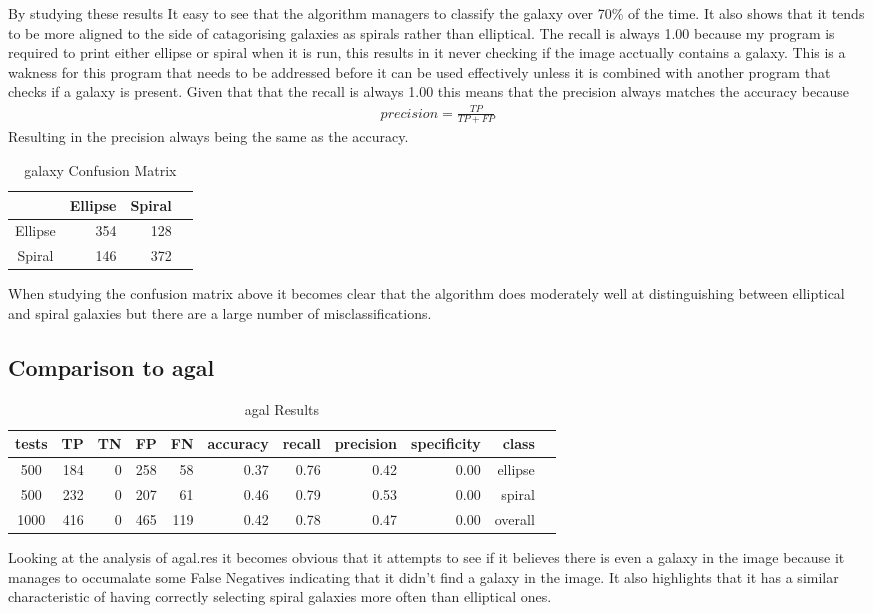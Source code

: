 \documentclass{article}
\begin{document}
By studying these results It easy to see that the algorithm managers to classify the galaxy over 70\% of the time. It also shows that it tends to be more aligned to the side of catagorising galaxies as spirals rather than elliptical. The recall is always 1.00 because my program is required to print either ellipse or spiral when it is run, this results in it never checking if the image acctually contains a galaxy. This is a wakness for this program that needs to be addressed before it can be used effectively unless it is combined with another program that checks if a galaxy is present. Given that that the recall is always 1.00 this means that the precision always matches the accuracy because
\begin{equation}
\begin{split}
precision = \frac{TP}{TP+FP}
\end{split}
\end{equation}
Resulting in the precision always being the same as the accuracy.

\begin{table}[h]
\caption{galaxy Confusion Matrix}
\centering
\begin{tabular}{|c |rr|r}
\hline 
& Ellipse & Spiral  \\[0.5ex]
\hline 
Ellipse & 354 & 128 \\
Spiral & 146 & 372 \\
\hline
\end{tabular}
\end{table}
When studying the confusion matrix above it becomes clear that the algorithm does moderately well at distinguishing between elliptical and spiral galaxies but there are a large number of misclassifications.

\subsection{Comparison to agal}
\begin{table}[h]
\caption{agal Results}
\centering
\begin{tabular}{c rrrrrrrrrr}
\hline \hline
tests & TP & TN & FP & FN & accuracy & recall & precision & specificity & class \\[0.5ex]
\hline
500 & 184 & 0 & 258 & 58 & 0.37 & 0.76 & 0.42 & 0.00 & ellipse \\
500 & 232 & 0 & 207 & 61 & 0.46 & 0.79 & 0.53 & 0.00 & spiral \\
1000 & 416 & 0 & 465 & 119 & 0.42 & 0.78 & 0.47 & 0.00 & overall \\
\hline
\end{tabular}
\end{table}
Looking at the analysis of agal.res it becomes obvious that it attempts to see if it believes there is even a galaxy in the image because it manages to occumalate some False Negatives indicating that it didn't find a galaxy in the image. It also highlights that it has a similar characteristic of having correctly selecting spiral galaxies more often than elliptical ones.
\end{document}
